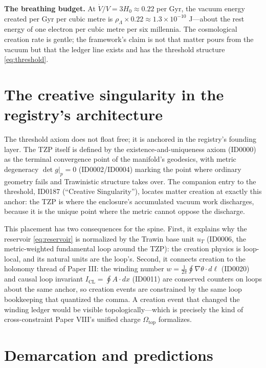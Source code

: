 \documentclass[11pt]{article}
\theoremstyle{remark}
\begin{document}
\textbf{The breathing budget.} At $\dot{V}/V = 3H_0 \approx 0.22$ per Gyr, the vacuum energy created per Gyr per cubic metre is $\rho_\Lambda \times 0.22 \approx 1.3 \times 10^{-10}$ J---about the rest energy of one electron per cubic metre per six millennia. The cosmological creation rate is gentle; the framework's claim is not that matter pours from the vacuum but that the ledger line exists and has the threshold structure \eqref{eq:threshold}.

\section{The creative singularity in the registry's architecture}
\label{sec:architecture}

The threshold axiom does not float free; it is anchored in the registry's founding layer. The TZP itself is defined by the existence-and-uniqueness axiom (ID0000) as the terminal convergence point of the manifold's geodesics, with metric degeneracy $\det g|_p = 0$ (ID0002/ID0004) marking the point where ordinary geometry fails and Trawinistic structure takes over. The companion entry to the threshold, ID0187 (``Creative Singularity''), locates matter creation at exactly this anchor: the TZP is where the enclosure's accumulated vacuum work discharges, because it is the unique point where the metric cannot oppose the discharge.

This placement has two consequences for the spine. First, it explains why the reservoir \eqref{eq:reservoir} is normalized by the Trawin base unit $u_T$ (ID0006, the metric-weighted fundamental loop around the TZP): the creation physics is loop-local, and its natural units are the loop's. Second, it connects creation to the holonomy thread of Paper III: the winding number $w = \frac{1}{2\pi}\oint \nabla\theta \cdot d\ell$ (ID0020) and causal loop invariant $I_{\mathrm{CL}} = \oint A \cdot dx$ (ID0011) are conserved counters on loops about the same anchor, so creation events are constrained by the same loop bookkeeping that quantized the comma. A creation event that changed the winding ledger would be visible topologically---which is precisely the kind of cross-constraint Paper VIII's unified charge $\Omega_{\mathrm{top}}$ formalizes.

\section{Demarcation and predictions}
\label{sec:demarcation}
\end{document}

